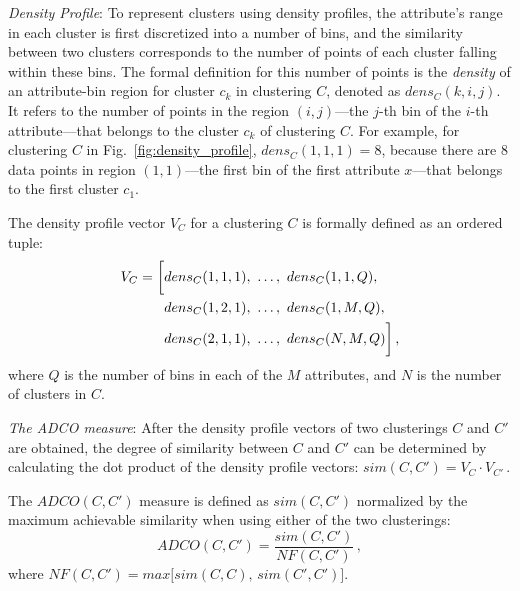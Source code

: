 \emph{Density Profile}: To represent clusters using density profiles, the attribute's range in each cluster is first discretized into a number of bins, and the similarity between two clusters corresponds to the number of points of each cluster falling within these bins. The formal definition for this number of points is the \textit{density} of an attribute-bin region for cluster $c_k$ in clustering $C$, denoted as $dens_C(k, i, j)$. It refers to the number of points in the region $(i, j)$---the $j$-th bin of the $i$-th attribute---that belongs to the cluster $c_k$ of clustering $C$. For example, for clustering $C$ in Fig.~\ref{fig:density_profile}, $dens_C(1, 1, 1) = 8$, because there are 8 data points in region $(1, 1)$---the first bin of the first attribute $x$---that belongs to the first cluster $c_1$.


The density profile vector $V_C$ for a clustering $C$ is formally defined as an ordered tuple:
\begin{align}
\notag V_C = \bigg[ & dens_C(1, 1, 1), ~\ldots, ~dens_C (1, 1, Q),\\
\notag & dens_C (1, 2, 1), ~\ldots, ~dens_C (1, M, Q),\\
& dens_C (2, 1, 1), ~\ldots, ~dens_C (N, M, Q) \bigg]\, ,\label{eq:densp}
\end{align}
where $Q$ is the number of bins in each of the $M$ attributes, and $N$ is the number of clusters in $C$.

\emph{The ADCO measure}: After the density profile vectors of two clusterings $C$ and $C'$ are obtained, the degree of similarity between  $C$ and $C'$ can be determined by calculating the dot product of the density profile vectors:
$sim(C, C') = V_C  \cdot V_{C'} \, .$

The $ADCO(C,C')$ measure is defined as $sim(C,C')$ normalized by the maximum achievable similarity when using either of the two clusterings:
\begin{equation}
ADCO(C, C') = \frac{sim(C, C')}{NF(C, C')} \, , \label{eq:adco}
\end{equation}
where $NF(C, C') = max \big[sim(C, C), \,sim(C', C')\big]$.

